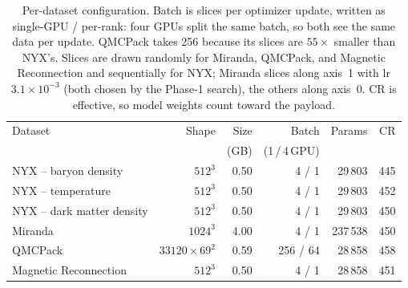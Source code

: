 \begin{table}[t]
  \centering
  \caption{Per-dataset configuration. Batch is slices per optimizer update,
  written as single-GPU / per-rank: four GPUs split the same batch, so both see
  the same data per update. QMCPack takes 256 because its slices are
  $55\times$ smaller than NYX's. Slices are drawn randomly for Miranda,
  QMCPack, and Magnetic Reconnection and sequentially for NYX; Miranda slices
  along axis~1 with lr $3.1\times10^{-3}$ (both chosen by the Phase-1 search),
  the others along axis~0. $\mathrm{CR}$ is effective, so model weights count
  toward the payload.}
  \label{tab:parallel-config}
  \begin{tabular}{lrrrrr}
    \toprule
    Dataset & Shape & Size & Batch & Params & CR \\
            &       & (GB) & (1\,/\,4\,GPU) & & \\
    \midrule
    NYX -- baryon density      & $512^3$               & 0.50 & 4 / 1    &  29\,803 & 445 \\
    NYX -- temperature         & $512^3$               & 0.50 & 4 / 1    &  29\,803 & 452 \\
    NYX -- dark matter density & $512^3$               & 0.50 & 4 / 1    &  29\,803 & 450 \\
    Miranda                    & $1024^3$              & 4.00 & 4 / 1    & 237\,538 & 450 \\
    QMCPack                    & $33120\!\times\!69^2$ & 0.59 & 256 / 64 &  28\,858 & 458 \\
    Magnetic Reconnection      & $512^3$               & 0.50 & 4 / 1    &  28\,858 & 451 \\
    \bottomrule
  \end{tabular}
\end{table}

